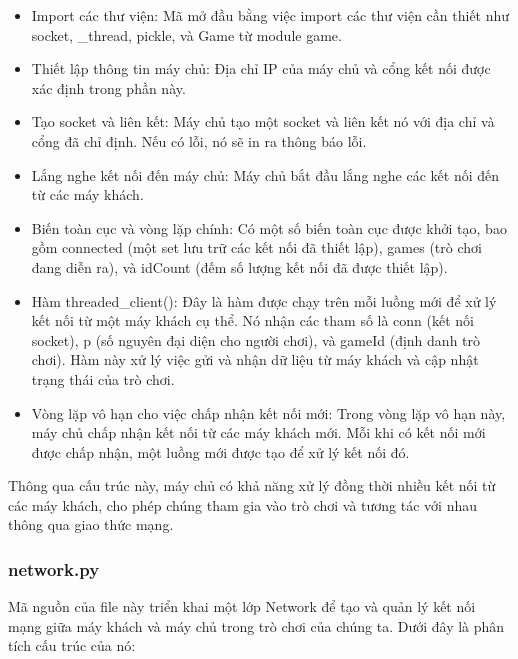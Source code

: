 \documentclass[a4paper]{article}
\begin{document}
\begin{itemize}
    \item Import các thư viện: Mã mở đầu bằng việc import các thư viện cần thiết như socket, \_thread, pickle, và Game từ module game.
    \item Thiết lập thông tin máy chủ: Địa chỉ IP của máy chủ và cổng kết nối được xác định trong phần này.
    \item Tạo socket và liên kết: Máy chủ tạo một socket và liên kết nó với địa chỉ và cổng đã chỉ định. Nếu có lỗi, nó sẽ in ra thông báo lỗi.
    \item Lắng nghe kết nối đến máy chủ: Máy chủ bắt đầu lắng nghe các kết nối đến từ các máy khách.
    \item Biến toàn cục và vòng lặp chính: Có một số biến toàn cục được khởi tạo, bao gồm connected (một set lưu trữ các kết nối đã thiết lập), games (trò chơi đang diễn ra), và idCount (đếm số lượng kết nối đã được thiết lập).
    \item Hàm threaded\_client(): Đây là hàm được chạy trên mỗi luồng mới để xử lý kết nối từ một máy khách cụ thể. Nó nhận các tham số là conn (kết nối socket), p (số nguyên đại diện cho người chơi), và gameId (định danh trò chơi). Hàm này xử lý việc gửi và nhận dữ liệu từ máy khách và cập nhật trạng thái của trò chơi.
    \item Vòng lặp vô hạn cho việc chấp nhận kết nối mới: Trong vòng lặp vô hạn này, máy chủ chấp nhận kết nối từ các máy khách mới. Mỗi khi có kết nối mới được chấp nhận, một luồng mới được tạo để xử lý kết nối đó.
\end{itemize}
Thông qua cấu trúc này, máy chủ có khả năng xử lý đồng thời nhiều kết nối từ các máy khách, cho phép chúng tham gia vào trò chơi và tương tác với nhau thông qua giao thức mạng.
\subsubsection{network.py}

Mã nguồn của file này triển khai một lớp Network để tạo và quản lý kết nối mạng giữa máy khách và máy chủ trong trò chơi của chúng ta. Dưới đây là phân tích cấu trúc của nó:
\end{document}
